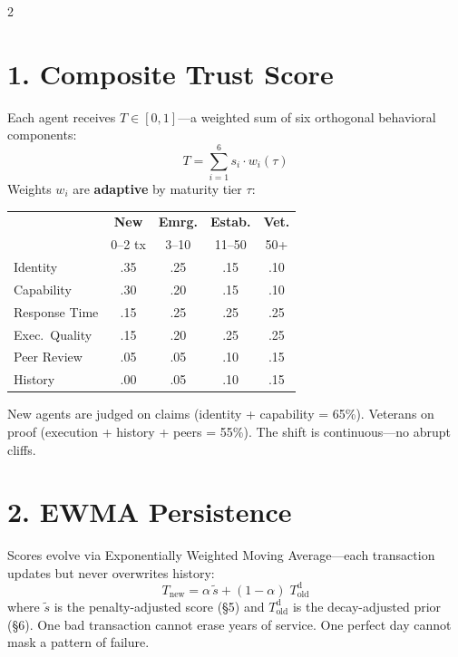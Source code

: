 \documentclass[10pt,a4paper]{article}
\begin{document}
\begin{multicols}{2}

\section{1.\; Composite Trust Score}

Each agent receives $T \in [0,1]$---a weighted sum of six orthogonal behavioral components:
%
\[
  T = \sum_{i=1}^{6} s_i \cdot w_i(\tau)
\]
%
Weights $w_i$ are \textbf{adaptive} by maturity tier $\tau$:

\vspace{1pt}
{\footnotesize
\begin{tabular}{@{}lcccc@{}}
\toprule
 & \textbf{New} & \textbf{Emrg.} & \textbf{Estab.} & \textbf{Vet.} \\
 & \scriptsize 0--2 tx & \scriptsize 3--10 & \scriptsize 11--50 & \scriptsize 50+ \\
\midrule
Identity       & .35 & .25 & .15 & .10 \\
Capability     & .30 & .20 & .15 & .10 \\
Response Time  & .15 & .25 & .25 & .25 \\
Exec.\ Quality & .15 & .20 & .25 & .25 \\
Peer Review    & .05 & .05 & .10 & .15 \\
History        & .00 & .05 & .10 & .15 \\
\bottomrule
\end{tabular}}
\vspace{2pt}

New agents are judged on claims (identity + capability = 65\%). Veterans on proof (execution + history + peers = 55\%). The shift is continuous---no abrupt cliffs.

\section{2.\; EWMA Persistence}

Scores evolve via Exponentially Weighted Moving Average---each transaction updates but never overwrites history:
%
\[
  \boxed{\;T_{\!\text{new}}
    = \alpha\,\tilde{s}
    + (1-\alpha)\;T_{\text{old}}^{\text{d}}\;}
\]
%
where $\tilde{s}$ is the penalty-adjusted score (\S5) and $T_{\text{old}}^{\text{d}}$ is the decay-adjusted prior (\S6). One bad transaction cannot erase years of service. One perfect day cannot mask a pattern of failure.


\end{multicols}
\end{document}
